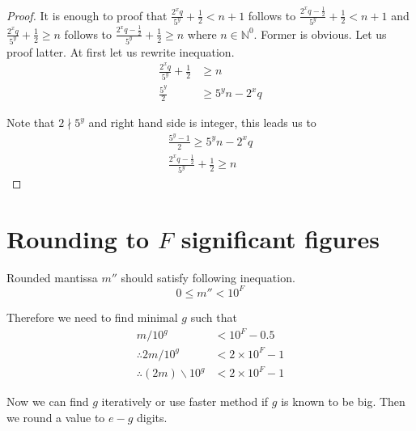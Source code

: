 \documentclass[english]{article}
\newcommand{\idiv}{\backslash}
\renewcommand{\leq}{\leqslant}
\renewcommand{\geq}{\geqslant}
\begin{document}
\begin{proof}
    It is enough to proof that $\frac{2^x q}{5^y} + \frac{1}{2} < n+1$
    follows to $\frac{2^x q - \frac{1}{2}}{5^y} + \frac{1}{2} < n+1$
    and $\frac{2^x q}{5^y} + \frac{1}{2} \geq n$
    follows to $\frac{2^x q - \frac{1}{2}}{5^y} + \frac{1}{2} \geq n$
    where $n \in \mathbb{N}^0$.
    Former is obvious. Let us proof latter. At first let us rewrite inequation.
    \begin{align*}
        \frac{2^x q}{5^y} + \frac{1}{2} & \geq n \\
        \frac{5^y}{2} & \geq 5^y n - 2^x q
    \end{align*}

    Note that $2 \nmid 5^{y}$ and right hand side is integer, this leads us to
    \begin{align*}
        \frac{5^y - 1}{2} \geq 5^y n - 2^x q \\
        \frac{2^x q - \frac{1}{2}}{5^y} + \frac{1}{2} \geq n
    \end{align*}
\end{proof}

\section{Rounding to $F$ significant figures}

Rounded mantissa $m''$ should satisfy following inequation.
\[
    0 \leq m'' < 10^F
\]

Therefore we need to find minimal $g$ such that
\begin{align*}
    m / 10^g & < 10^F - 0.5 \\
    \therefore 2m / 10^g & < 2 \times 10^F - 1 \\
    \therefore (2m) \idiv 10^g & < 2 \times 10^F - 1
\end{align*}

Now we can find $g$ iteratively or use faster method if $g$ is known to be big.
Then we round a value to $e-g$ digits.
\end{document}
